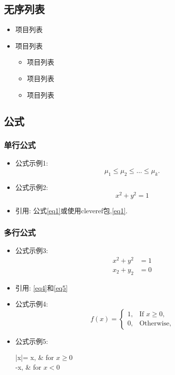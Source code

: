 \subsection{无序列表}


\begin{itemize}
	\item
	项目列表
	\item
	项目列表
	
	\begin{itemize}
		\item
		项目列表
		\item
		项目列表
		\item
		项目列表
	\end{itemize}
\end{itemize}

\subsection{公式}
\subsubsection{单行公式}
\begin{itemize}
	\item
	公式示例1: \[\mu_1\le\mu_2\le \dots\le \mu_k.\]
	\item
	公式示例2: \begin{equation}\label{eq1}
	x^2+y^2=1
	\end{equation}
	\item
	引用: 公式\eqref{eq1}或使用cleveref包,\cref{eq1}.
\end{itemize}

\subsubsection{多行公式}

\begin{itemize}
	\item
	公式示例3:\\
	\begin{align}
	x^2+y^2 &= 1 \label{eq4}\\
	x_2+y_2 &= 0  \label{eq5}
	\end{align}
	\item
	引用: \cref{eq4}和\cref{eq5}
	\item
	公式示例4:\\
	\[
	f(x)=\begin{cases} 1, & \mbox{If $x\ge 0$}, \\ 0,& \mbox{Otherwise,}\end{cases}
	\]
	\item
	公式示例5:\\
	
	\begin{numcases}{|x|=}
	x, & for $x \geq 0$\\
	-x, & for $x < 0$
	\end{numcases}
\end{itemize}

